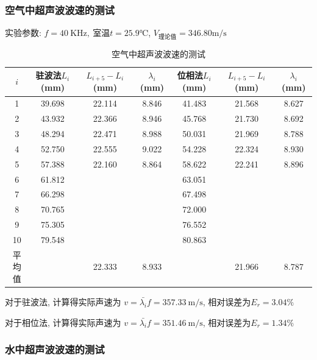\documentclass[zihao=5, UTF8]{article}
\theoremstyle{MyLineTheoremStyle} %
\theoremstyle{MyBlockTheoremStyle} %
\theoremstyle{MySubsubsectionStyle} %
\begin{document}
\subsubsection{空气中超声波波速的测试}
实验参数: $f = 40\  \mathrm{KHz},\  \text{室温} t = 25.9℃$, $V_\text{理论值} = 346.80 \mathrm{m/s}$
\begin{table}[H]
\centering
\begin{tabular}{|c|c|c|c|c|c|c|} 
\hline
$i$  & 驻波法$L_i$ (mm)    & $L_{i + 5} - L_i$ (mm) & $\lambda_i$ (mm) &位相法$L_i$ (mm)  & $L_{i + 5} - L_i$ (mm) & $\lambda_i$ (mm)  \\ 
\hline
1   & 39.698 & 22.114 & 8.846 & 41.483 & 21.568 & 8.627  \\ 
\hline
2   & 43.932 & 22.366 & 8.946 & 45.768 & 21.730 & 8.692  \\ 
\hline
3   & 48.294 & 22.471 & 8.988 & 50.031 & 21.969 & 8.788  \\ 
\hline
4   & 52.750 & 22.555 & 9.022 & 54.228 & 22.324 & 8.930  \\ 
\hline
5   & 57.388 & 22.160 & 8.864 & 58.622 & 22.241 & 8.896  \\ 
\hline
6   & 61.812 &        &       & 63.051 &        &        \\ 
\hline
7   & 66.298 &        &       & 67.498 &        &        \\ 
\hline
8   & 70.765 &        &       & 72.000 &        &        \\ 
\hline
9   & 75.305 &        &       & 76.552 &        &        \\ 
\hline
10  & 79.548 &        &       & 80.863 &        &        \\ 
\hline
平均值 &        & 22.333 & 8.933 &        & 21.966 & 8.787  \\
\hline
\end{tabular}
\caption{空气中超声波波速的测试}
\end{table}

对于驻波法, 计算得实际声速为 $v = \bar{\lambda_i} f = 357.33 \ \mathrm{m/s}$, 相对误差为$E_r = 3.04 \%$

对于相位法, 计算得实际声速为 $v = \bar{\lambda_i} f = 351.46 \ \mathrm{m/s}$, 相对误差为$E_r = 1.34 \%$

\subsubsection{水中超声波波速的测试}
\end{document}
